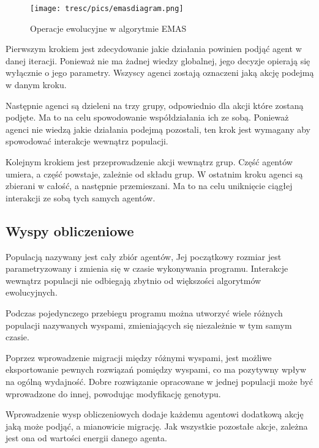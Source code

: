 \begin{figure}[H]
\begin{center} 
\texttt{[image: tresc/pics/emasdiagram.png]}
\caption{Operacje ewolucyjne w algorytmie EMAS}
\label{fig:emasdiagram}
\end{center}
\end{figure}

Pierwszym krokiem jest zdecydowanie jakie działania powinien podjąć agent w danej iteracji. Ponieważ nie ma żadnej wiedzy globalnej, jego decyzje opierają się wyłącznie o jego parametry. Wszyscy agenci zostają oznaczeni jaką akcję podejmą w danym kroku.

Następnie agenci są dzieleni na trzy grupy, odpowiednio dla akcji które zostaną podjęte. Ma to na celu spowodowanie współdziałania ich ze sobą. Ponieważ agenci nie wiedzą jakie działania podejmą pozostali, ten krok jest wymagany aby spowodować interakcje wewnątrz populacji.

Kolejnym krokiem jest przeprowadzenie akcji wewnątrz grup. Część agentów umiera, a część powstaje, zależnie od składu grup. W ostatnim kroku agenci są zbierani w całość, a następnie przemieszani. Ma to na celu uniknięcie ciągłej interakcji ze sobą tych samych agentów.


\subsection{Wyspy obliczeniowe}
Populacją nazywany jest cały zbiór agentów, Jej początkowy rozmiar jest parametryzowany i zmienia się w czasie wykonywania programu. Interakcje wewnątrz populacji nie odbiegają zbytnio od większości algorytmów ewolucyjnych.

Podczas pojedynczego przebiegu programu można utworzyć wiele różnych populacji nazywanych wyspami\cite{emas3}, zmieniających się niezależnie w tym samym czasie. 

Poprzez wprowadzenie migracji między różnymi wyspami, jest możliwe eksportowanie pewnych rozwiązań pomiędzy wyspami, co ma pozytywny wpływ na ogólną wydajność. Dobre rozwiązanie opracowane w jednej populacji może być wprowadzone do innej, powodując modyfikację genotypu. 

Wprowadzenie wysp obliczeniowych dodaje każdemu agentowi dodatkową akcję jaką może podjąć, a mianowicie migrację. Jak wszystkie pozostałe akcje, zależna jest ona od wartości energii danego agenta.



